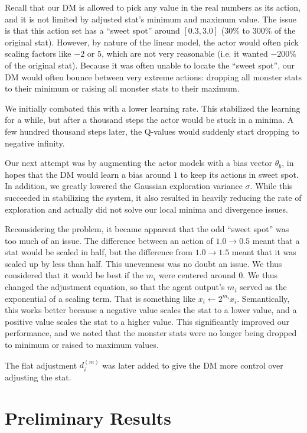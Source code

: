 \documentclass{article}
\begin{document}
Recall that our DM is allowed to pick any value in the real numbers as its action, and it is not limited by adjusted stat's minimum and maximum value. The issue is that this action set has a ``sweet spot'' around $[0.3, 3.0]$ (30\% to 300\% of the original stat). However, by nature of the linear model, the actor would often pick scaling factors like $-2$ or $5$, which are not very reasonable (i.e. it wanted $-200\%$ of the original stat). Because it was often unable to locate the ``sweet spot'', our DM would often bounce between very extreme actions: dropping all monster stats to their minimum or raising all monster stats to their maximum.

We initially combated this with a lower learning rate. This stabilized the learning for a while, but after a thousand steps the actor would be stuck in a minima. A few hundred thousand steps later, the Q-values would suddenly start dropping to negative infinity.

Our next attempt was by augmenting the actor models with a bias vector $\theta_b$, in hopes that the DM would learn a bias around $1$ to keep its actions in sweet spot. In addition, we greatly lowered the Gaussian exploration variance $\sigma$. While this succeeded in stabilizing the system, it also resulted in heavily reducing the rate of exploration and actually did not solve our local minima and divergence issues.

Reconsidering the problem, it became apparent that the odd ``sweet spot'' was too much of an issue. The difference between an action of $1.0 \to 0.5$ meant that a stat would be scaled in half, but the difference from $1.0 \to 1.5$ meant that it was scaled up by less than half. This unevenness was no doubt an issue. We thus considered that it would be best if the $m_i$ were centered around 0. We thus changed the adjustment equation, so that the agent output's $m_i$ served as the exponential of a scaling term. That is something like $x_i \leftarrow 2^{m_i}x_i$. Semantically, this works better because a negative value scales the stat to a lower value, and a positive value scales the stat to a higher value. This significantly improved our performance, and we noted that the monster stats were no longer being dropped to minimum or raised to maximum values.

The flat adjustment $d^{(m)}_i$  was later added to give the DM more control over adjusting the stat.

\newpage
\section{Preliminary Results}
\end{document}
